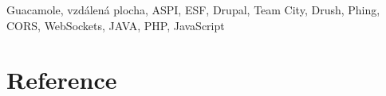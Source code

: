 \documentclass[10pt,final,oneside]{fithesis2}
\begin{document}
\begin{ThesisKeyWords}
Guacamole, vzdálená plocha, ASPI, ESF, Drupal, Team City, Drush, Phing, CORS, WebSockets, JAVA, PHP, JavaScript
\end{ThesisKeyWords}

\MainMatter

\tableofcontents








\printindex
\printglossary[type=\acronymtype,title={Zkratky}]
\printglossary
\listoffigures
\listoftables

\begingroup
\def\tmpchapter{0}
\renewcommand{\chaptername}{}
\renewcommand{\thechapter}{}
\chapter{Reference}
\renewcommand{\chapter}[2]{}%




\endgroup

\appendix

\end{document}
